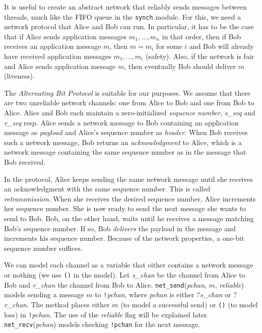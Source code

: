 \documentclass{report}
\begin{document}
It is useful to create an abstract network that reliably sends messages
between threads, much like the FIFO queue in the \texttt{synch} module.
For this, we need a network protocol that Alice and Bob can run.
In particular, it has to be the case that if Alice sends application
messages $m_1, ..., m_n$ in that order, then if Bob receives an
application message
$m$, then $m = m_i$ for some $i$ and Bob will already have received
application messages $m_1, ..., m_i$ (safety).
Also, if the network is fair and Alice sends application message
$m$, then eventually Bob should deliver $m$ (liveness).

The \emph{Alternating Bit Protocol} is suitable for our purposes.
We assume that there are two unreliable network channels: one from Alice
to Bob and one from Bob to Alice.
Alice and Bob each maintain a zero-initialized
\emph{sequence number},
%
\textit{s\_seq} and \textit{r\_seq} resp.
Alice sends a network message to Bob containing an
application message as \emph{payload} and Alice's sequence number
as \emph{header}.
When Bob receives such a network message, Bob returns an
\emph{acknowledgment}
%
to Alice, which is a network message
containing the same sequence number as in the message that Bob received.

In the protocol, Alice keeps sending the same network message until she
receives an acknowledgment with the same sequence number.
This is called \emph{retransmission}.
%
When she receives the desired sequence number, Alice increments her sequence number.
She is now ready to send the next message she wants to send to Bob.
Bob, on the other hand, waits until he receives a message matching
Bob's sequence number.  If so, Bob \emph{delivers} the payload in the
message and increments his sequence number.
Because of the network properties,  a one-bit sequence number suffices.

We can model each
channel as a variable that either contains a network message or nothing
(we use \texttt{()} in the model).  Let \textit{s\_chan} be the channel
from Alice to Bob and \textit{r\_chan} the channel from Bob to Alice.
\texttt{net\_send}(\textit{pchan}, $m$, \textit{reliable}) models sending
a message $m$ to
\texttt{!}\textit{pchan}, where \textit{pchan} is either ?\textit{s\_chan}
or ?\textit{r\_chan}.
The method places either $m$ (to model a successful send)
or \texttt{()} (to model loss) in \texttt{!}\textit{pchan}.
The use of the \textit{reliable} flag will be explained later.
\texttt{net\_recv}(\textit{pchan}) models checking \texttt{!pchan} for
the next message.
\end{document}

